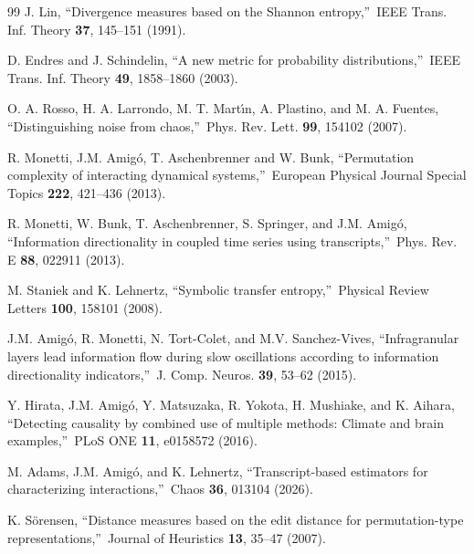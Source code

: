 \documentclass[%
 aip,
 amsmath,amssymb,
 reprint,%
]{revtex4-1}
\begin{document}
\begin{thebibliography}{99}
 J. Lin, \textquotedblleft Divergence measures based on the
Shannon entropy,\textquotedblright\ IEEE Trans. Inf. Theory \textbf{37},
145--151 (1991).

 D. Endres and J. Schindelin, \textquotedblleft A new
metric for probability distributions,\textquotedblright\ IEEE Trans. Inf.
Theory \textbf{49}, 1858--1860 (2003).

 O. A. Rosso, H. A. Larrondo, M. T. Mart\'{\i}n, A.
Plastino, and M. A. Fuentes, \textquotedblleft Distinguishing noise from
chaos,\textquotedblright\ Phys. Rev. Lett. \textbf{99}, 154102 (2007).

 R. Monetti, J.M. Amig\'{o}, T. Aschenbrenner and W.
Bunk, \textquotedblleft Permutation complexity of interacting dynamical
systems,\textquotedblright\ European Physical Journal Special Topics \textbf{%
222}, 421--436 (2013).

 R. Monetti, W. Bunk, T. Aschenbrenner, S. Springer,
and J.M. Amig\'{o}, \textquotedblleft Information directionality in coupled
time series using transcripts,\textquotedblright\ Phys. Rev. E \textbf{88},
022911 (2013).

 M. Staniek and K. Lehnertz, \textquotedblleft Symbolic
transfer entropy,\textquotedblright\ Physical Review Letters \textbf{100},
158101 (2008).

 J.M. Amig\'{o}, R. Monetti, N. Tort-Colet, and M.V.
Sanchez-Vives, \textquotedblleft Infragranular layers lead information flow
during slow oscillations according to information directionality
indicators,\textquotedblright\ J. Comp. Neuros. \textbf{39}, 53--62 (2015).

 Y. Hirata, J.M. Amig\'{o}, Y. Matsuzaka, R. Yokota, H.
Mushiake, and K. Aihara, \textquotedblleft Detecting causality by combined
use of multiple methods: Climate and brain examples,\textquotedblright\ PLoS
ONE \textbf{11}, e0158572 (2016).

 M. Adams, J.M. Amig\'{o}, and K. Lehnertz,
\textquotedblleft Transcript-based estimators for characterizing
interactions,\textquotedblright\ Chaos \textbf{36}, 013104 (2026). 

 K. S\"{o}rensen, \textquotedblleft Distance measures
based on the edit distance for permutation-type
representations,\textquotedblright\ Journal of Heuristics \textbf{13},
35--47 (2007). %


\end{thebibliography}
\end{document}
